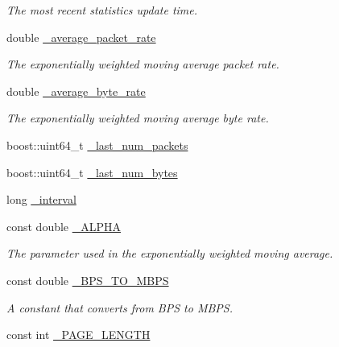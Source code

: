 \begin{DoxyCompactItemize}
\begin{DoxyCompactList}\small\item\em The most recent statistics update time. \end{DoxyCompactList}\item 
\hypertarget{class_stats_writer_a7adad49dc423bc12048d27266625e5f5}{
double \hyperlink{class_stats_writer_a7adad49dc423bc12048d27266625e5f5}{\_\-average\_\-packet\_\-rate}}
\label{class_stats_writer_a7adad49dc423bc12048d27266625e5f5}

\begin{DoxyCompactList}\small\item\em The exponentially weighted moving average packet rate. \end{DoxyCompactList}\item 
\hypertarget{class_stats_writer_aa3259729a45969d6a17f14a6009ca1a4}{
double \hyperlink{class_stats_writer_aa3259729a45969d6a17f14a6009ca1a4}{\_\-average\_\-byte\_\-rate}}
\label{class_stats_writer_aa3259729a45969d6a17f14a6009ca1a4}

\begin{DoxyCompactList}\small\item\em The exponentially weighted moving average byte rate. \end{DoxyCompactList}\item 
boost::uint64\_\-t \hyperlink{class_stats_writer_ac80670534878e9ebe11b34284637d32f}{\_\-last\_\-num\_\-packets}
\item 
boost::uint64\_\-t \hyperlink{class_stats_writer_a439f71be2d1560e7382a2174d1d83d0d}{\_\-last\_\-num\_\-bytes}
\item 
long \hyperlink{class_stats_writer_a938a61cbb87e7c29824c99766898efb6}{\_\-interval}
\item 
\hypertarget{class_stats_writer_ae1cdf4969ffcd323bc368227d47f9133}{
const double \hyperlink{class_stats_writer_ae1cdf4969ffcd323bc368227d47f9133}{\_\-ALPHA}}
\label{class_stats_writer_ae1cdf4969ffcd323bc368227d47f9133}

\begin{DoxyCompactList}\small\item\em The parameter used in the exponentially weighted moving average. \end{DoxyCompactList}\item 
\hypertarget{class_stats_writer_ab7b2cc6f988773376a16366b3dae4a31}{
const double \hyperlink{class_stats_writer_ab7b2cc6f988773376a16366b3dae4a31}{\_\-BPS\_\-TO\_\-MBPS}}
\label{class_stats_writer_ab7b2cc6f988773376a16366b3dae4a31}

\begin{DoxyCompactList}\small\item\em A constant that converts from BPS to MBPS. \end{DoxyCompactList}\item 
const int \hyperlink{class_stats_writer_a8d6a8784b4517bd4968bb8b04cbbb205}{\_\-PAGE\_\-LENGTH}
\end{DoxyCompactItemize}



